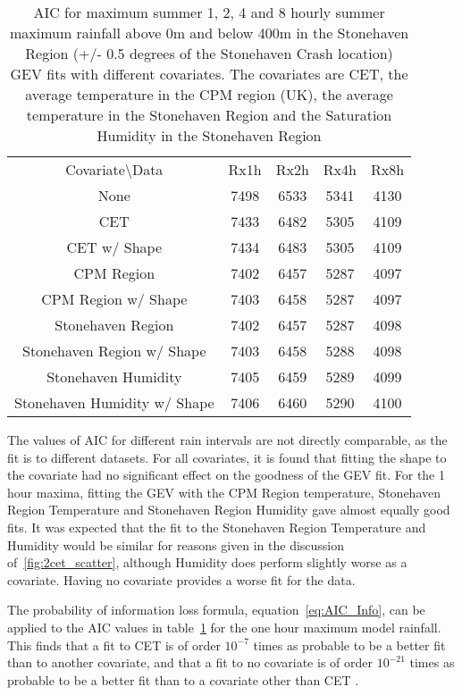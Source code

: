 \begin{table}[H]
    \centering
    \begin{tabular}{c c c c c}
        Covariate\textbackslash Data & Rx1h & Rx2h & Rx4h & Rx8h \\
        None &7498&6533&5341&4130 \\
        CET &7433&6482&5305&4109 \\
        CET w/ Shape &7434&6483&5305&4109 \\
        CPM Region &7402&6457&5287&4097 \\
        CPM Region w/ Shape &7403&6458&5287&4097 \\
        Stonehaven Region &7402&6457&5287&4098 \\
        Stonehaven Region w/ Shape &7403&6458&5288&4098 \\
        Stonehaven Humidity &7405&6459&5289&4099 \\
        Stonehaven Humidity w/ Shape &7406&6460&5290&4100 \\
    \end{tabular}
    \caption[AIC for maximum summer rainfall]{
        AIC for maximum summer 1, 2, 4 and 8 hourly summer maximum rainfall
        above 0m and below 400m in the Stonehaven Region (+/- 0.5 degrees of the Stonehaven Crash location)
        GEV fits with different covariates.
    The covariates are CET, the average temperature in the CPM region (UK),
    the average temperature in the Stonehaven Region and
    the Saturation Humidity in the Stonehaven Region}
    \label{tab:AICtable}
\end{table}

The values of AIC for different rain intervals are not directly comparable,
    as the fit is to different datasets.
For all covariates,
    it is found that fitting the shape to the covariate had no significant effect on the goodness of the GEV fit.
For the 1 hour maxima,
    fitting the GEV with the CPM Region temperature, Stonehaven Region Temperature and Stonehaven Region Humidity gave almost equally good fits.
It was expected that the fit to the Stonehaven Region Temperature and Humidity would be similar for
    reasons given in the discussion of~\ref{fig:2cet_scatter},
    although Humidity does perform slightly worse as a covariate.
Having no covariate provides a worse fit for the data.

The probability of information loss formula, equation~\ref{eq:AIC_Info},
    can be applied to the AIC values in table~\ref{tab:AICtable} for the one hour maximum model rainfall.
This finds that a fit to CET is of order $10^{-7}$ times as probable to be a better fit than to another covariate,
    and that a fit to no covariate is of order $10^{-21}$ times as probable to be a better fit than to a covariate other than CET .

